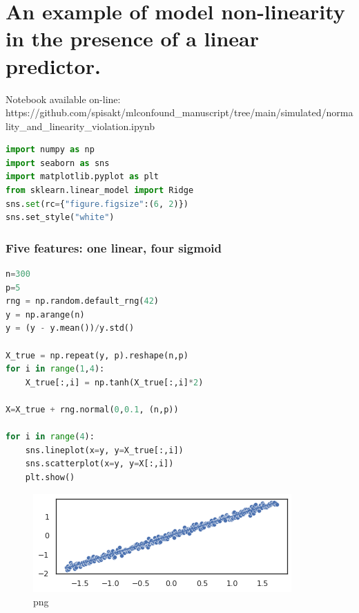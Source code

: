 \hypertarget{an-example-of-model-non-linearity-in-the-presence-of-a-linear-predictor.}{%
\section{An example of model non-linearity in the presence of a linear
predictor.}\label{an-example-of-model-non-linearity-in-the-presence-of-a-linear-predictor.}}

Notebook available on-line:
https://github.com/spisakt/mlconfound\_manuscript/tree/main/simulated/normality\_and\_linearity\_violation.ipynb

\begin{lstlisting}[language=Python]
import numpy as np
import seaborn as sns
import matplotlib.pyplot as plt
from sklearn.linear_model import Ridge
sns.set(rc={"figure.figsize":(6, 2)})
sns.set_style("white")
\end{lstlisting}

\hypertarget{five-features-one-linear-four-sigmoid}{%
\subsubsection{Five features: one linear, four
sigmoid}\label{five-features-one-linear-four-sigmoid}}

\begin{lstlisting}[language=Python]
n=300
p=5
rng = np.random.default_rng(42)
y = np.arange(n)
y = (y - y.mean())/y.std()

X_true = np.repeat(y, p).reshape(n,p)
for i in range(1,4):
    X_true[:,i] = np.tanh(X_true[:,i]*2)

X=X_true + rng.normal(0,0.1, (n,p))

for i in range(4):
    sns.lineplot(x=y, y=X_true[:,i])
    sns.scatterplot(x=y, y=X[:,i])
    plt.show()
\end{lstlisting}

\begin{figure}
\centering
\includegraphics{normality_and_linearity_violation_files/normality_and_linearity_violation_3_0.png}
\caption{png}
\end{figure}

